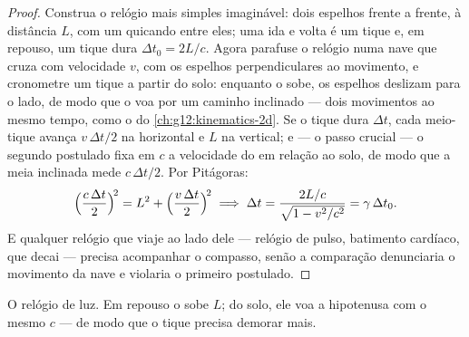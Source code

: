 \begin{proof}
Construa o relógio mais simples imaginável: dois espelhos frente a frente, à distância
$L$, com um  quicando entre eles; uma ida e volta é um tique e, em repouso, um
tique dura $\Delta t_0 = 2L/c$. Agora parafuse o relógio numa nave que cruza com
velocidade $v$, com os espelhos perpendiculares ao movimento, e cronometre um tique a
partir do solo: enquanto o  sobe, os espelhos deslizam para o lado, de modo que o
 voa por um caminho inclinado --- dois movimentos ao mesmo tempo, como o  do
\cref{ch:g12:kinematics-2d}. Se o tique dura $\Delta t$, cada meio-tique avança
$v\,\Delta t/2$ na horizontal e $L$ na vertical; e --- o passo crucial --- o segundo
postulado fixa em $c$ a velocidade do  em relação ao solo, de modo que a meia
 inclinada mede $c\,\Delta t/2$. Por Pitágoras:
\[
\Bigl(\frac{c\,\Delta t}{2}\Bigr)^{\!2} = L^2 + \Bigl(\frac{v\,\Delta t}{2}\Bigr)^{\!2}
\;\Longrightarrow\;
\Delta t = \frac{2L/c}{\sqrt{1 - v^2/c^2}} = \gamma\,\Delta t_0 .
\]
E qualquer relógio que viaje ao lado dele --- relógio de pulso, batimento cardíaco,
 que decai --- precisa acompanhar o compasso, senão a comparação denunciaria o
movimento da nave e violaria o primeiro postulado.
\end{proof}

\begin{omfigure}
\qquad
{}

{\small O relógio de luz. Em repouso o  sobe $L$; do solo, ele voa a hipotenusa com o
mesmo $c$ --- de modo que o tique precisa demorar mais.}
\end{omfigure}


